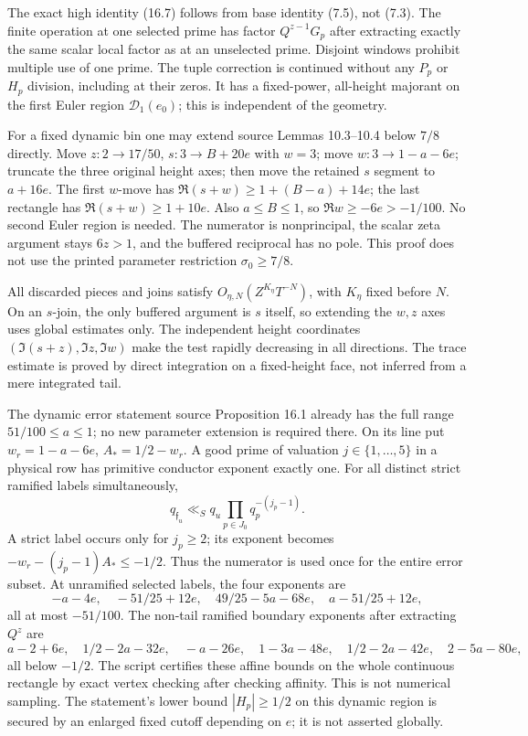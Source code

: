 \documentclass[12pt]{article}
\begin{document}
The exact high identity (16.7) follows from base identity (7.5),
not (7.3).  The finite operation at one selected prime has factor
\(Q^{z-1}G_p\) after extracting exactly the same scalar local
factor as at an unselected prime.  Disjoint windows prohibit
multiple use of one prime.  The tuple correction is continued
without any \(P_p\) or \(H_p\) division, including at their zeros.
It has a fixed-power, all-height majorant on the first Euler region
\(\mathcal D_1(e_0)\); this is independent of the geometry.

For a fixed dynamic bin one may extend source Lemmas 10.3--10.4
below \(7/8\) directly.  Move \(z:2\to17/50\), \(s:3\to B+20e\)
with \(w=3\); move \(w:3\to1-a-6e\); truncate the three original
height axes; then move the retained \(s\) segment to \(a+16e\).
The first \(w\)-move has \(\Re(s+w)\ge1+(B-a)+14e\);
the last rectangle has \(\Re(s+w)\ge1+10e\).
Also \(a\le B\le1\), so \(\Re w\ge-6e>-1/100\).
No second Euler region is needed.  The numerator is nonprincipal,
the scalar zeta argument stays \(6z>1\), and the buffered reciprocal
has no pole.  This proof does not use the printed parameter
restriction \(\sigma_0\ge7/8\).

All discarded pieces and joins satisfy \(O_{\eta,N}(Z^{K_\eta}T^{-N})\),
with \(K_\eta\) fixed before \(N\).  On an \(s\)-join, the only
buffered argument is \(s\) itself, so extending the \(w,z\) axes
uses global estimates only.  The independent height coordinates
\((\Im(s+z),\Im z,\Im w)\) make the test rapidly decreasing in all
directions.  The trace estimate is proved by direct integration on
a fixed-height face, not inferred from a mere integrated tail.

The dynamic error statement source Proposition 16.1 already has
the full range \(51/100\le a\le1\); no new parameter extension
is required there.  On its line put \(w_r=1-a-6e\),
\(A_*=1/2-w_r\).  A good prime of valuation \(j\in\{1,\ldots,5\}\)
in a physical row has primitive conductor exponent exactly one.
For all distinct strict ramified labels simultaneously,
\[
 q_{\mathfrak f_u}\ll_S q_u\prod_{p\in J_0}q_p^{-(j_p-1)}.
\]
A strict label occurs only for \(j_p\ge2\); its exponent becomes
\(-w_r-(j_p-1)A_*\le-1/2\).
Thus the numerator is used once for the entire error subset.
At unramified selected labels, the four exponents are
\[
 -a-4e,\quad-51/25+12e,\quad49/25-5a-68e,\quad
 a-51/25+12e,
\]
all at most \(-51/100\).
The non-tail ramified boundary exponents after extracting \(Q^z\)
are
\[
 a-2+6e,\quad1/2-2a-32e,\quad
 -a-26e,\quad1-3a-48e,\quad
 1/2-2a-42e,\quad2-5a-80e,
\]
all below \(-1/2\).
The script certifies these affine bounds on the whole continuous
rectangle by exact vertex checking after checking affinity.
This is not numerical sampling.  The statement's lower bound
\(|H_p|\ge1/2\) on this dynamic region is secured by an enlarged
fixed cutoff depending on \(e\); it is not asserted globally.
\end{document}
